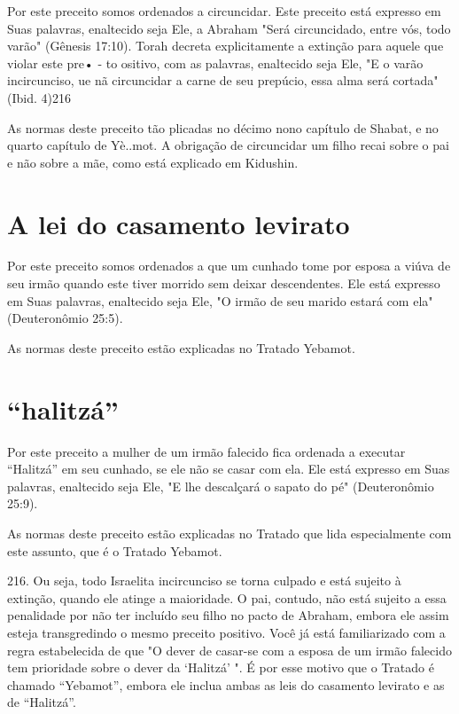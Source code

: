 Por este preceito somos ordenados a circuncidar. Este preceito está
expresso em Suas palavras, enaltecido seja Ele, a Abraham "Será
circuncidado, entre vós, todo varão" (Gênesis 17:10). Torah decreta
explicitamente a ex­tinção para aquele que violar este pre• - to
ositivo, com as palavras, enalteci­do seja Ele, "E o varão incircunciso,
ue nã circuncidar a carne de seu prepú­cio, essa alma será cortada"
(Ibid. 4)216

As normas deste preceito tão plicadas no décimo nono capítulo de Shabat,
e no quarto capítulo de Yè..mot. A obrigação de circuncidar um filho
recai sobre o pai e não sobre a mãe, como está explicado em Kidushin.

\section{A lei do casamento levirato}

Por este preceito somos ordenados a que um cunhado tome por es­posa a
viúva de seu irmão quando este tiver morrido sem deixar descendentes.
Ele está expresso em Suas palavras, enaltecido seja Ele, "O irmão de seu
mari­do estará com ela" (Deuteronômio 25:5).


As normas deste preceito estão explicadas no Tratado Yebamot.


\section{``halitzá''}

Por este preceito a mulher de um irmão falecido fica ordenada a
exe­cutar ``Halitzá'' em seu cunhado, se ele não se casar com ela. Ele
está expresso em Suas palavras, enaltecido seja Ele, "E lhe descalçará o
sapato do pé" (Deute­ronômio 25:9).

As normas deste preceito estão explicadas no Tratado que lida
espe­cialmente com este assunto, que é o Tratado Yebamot.

216. Ou seja, todo Israelita incircunciso se torna culpado e está
sujeito à extinção, quando ele atin­ge a maioridade. O pai, contudo, não
está sujeito a essa penalidade por não ter incluído seu filho no pacto
de Abraham, embora ele assim esteja transgredindo o mesmo preceito
positivo.
Você já está familiarizado com a regra estabelecida de que "O dever de
casar-se com a esposa de um irmão falecido tem prioridade sobre o dever
da `Halitzá' ". É por esse motivo que o Tratado é chamado ``Yebamot'',
embo­ra ele inclua ambas as leis do casamento levirato e as de
``Halitzá''.

